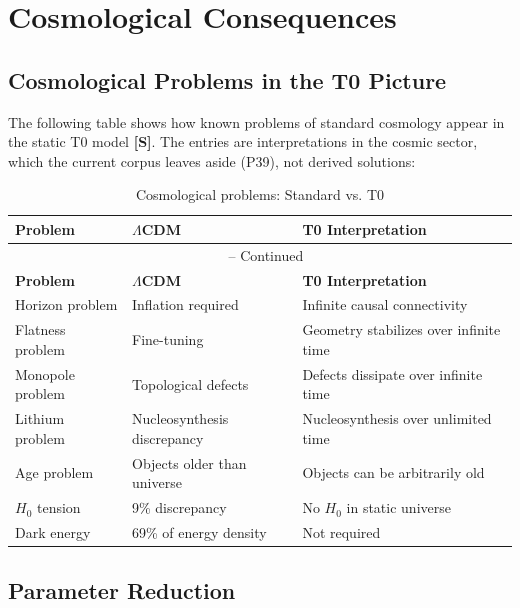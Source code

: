 	\section{Cosmological Consequences}
	
	\subsection{Cosmological Problems in the T0 Picture}
	
	The following table shows how known problems of standard cosmology appear in the static T0 model \textbf{[S]}. The entries are interpretations in the cosmic sector, which the current corpus leaves aside (P39), not derived solutions:
	
	\begin{longtable}{p{3.5cm}p{4.5cm}p{6cm}}
		\caption{Cosmological problems: Standard vs. T0} \\
		\toprule
		\textbf{Problem} & \textbf{$\Lambda$CDM} & \textbf{T0 Interpretation} \\
		\midrule
		\endfirsthead
		\multicolumn{3}{c}{\tablename\ \thetable{} -- Continued} \\
		\toprule
		\textbf{Problem} & \textbf{$\Lambda$CDM} & \textbf{T0 Interpretation} \\
		\midrule
		\endhead
		Horizon problem & Inflation required & Infinite causal connectivity \\
		Flatness problem & Fine-tuning & Geometry stabilizes over infinite time \\
		Monopole problem & Topological defects & Defects dissipate over infinite time \\
		Lithium problem & Nucleosynthesis discrepancy & Nucleosynthesis over unlimited time \\
		Age problem & Objects older than universe & Objects can be arbitrarily old \\
		$H_0$ tension & 9\% discrepancy & No $H_0$ in static universe \\
		Dark energy & 69\% of energy density & Not required \\
		\bottomrule
	\end{longtable}
\normalsize
	
	\subsection{Parameter Reduction}
	
